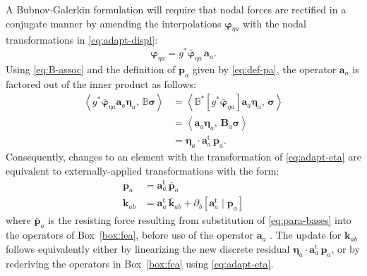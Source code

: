 A Bubnov-Galerkin formulation will require that nodal forces are rectified in a conjugate manner by amending
the interpolations \(\bm{\varphi}^{}_{\eta a}\) with
the nodal transformations in \eqref{eq:adapt-displ}: 
\begin{equation}
{\bm{\varphi}}^{}_{\eta a} = g^*\bar{\bm{\varphi}}^{}_{\eta a} \, \mathbf{a}_a .
\label{eq:adapt-eta}
\end{equation}
Using \eqref{eq:B-assoc} and the definition of \(\bm{p}_a\) given by \eqref{eq:def-pa},
the operator \(\mathbf{a}_a\) is factored out of the inner product as follows: %
\begin{equation*} 
\begin{aligned}
\left< g^* \bar{\bm{\varphi}}_{\eta a} \mathbf{a}_a \bm{\eta}_a,\, \mathbb{B} \bm{\sigma}\right> 
&= \left< \mathbb{B}^*[g^* \bar{\bm{\varphi}}_{\eta a}] \mathbf{a}_a \bm{\eta}_a,\, \bm{\sigma}\right> \\
&= \left< \mathbf{a}_a \bm{\eta}_a,\, \bm{B}_a \bm{\sigma}\right> \\
&=\bm{\eta}_a\cdot\mathbf{a}^{\mathrm{t}}_a\,\bm{p}_a .
\end{aligned}
\end{equation*}
Consequently, changes to an element with the transformation 
of \eqref{eq:adapt-eta} are equivalent to externally-applied transformations with the form:
\begin{equation} 
\begin{aligned}
\bm{p}_a    &= \mathbf{a}_a^{\mathrm{t}} \, \bar{\bm{p}}_a \\
\mathbf{k}_{ab} &= \mathbf{a}_a^{\mathrm{t}} \, \bar{\mathbf{k}}_{ab} 
  + \partial^{}_b \left[\mathbf{a}_a^{\mathrm{t}} \mid \bar{\bm{p}}_a \right]
\end{aligned}
\label{eq:adapt-para-bubn}
\end{equation}
where $\bar{\bm{p}}_{a}$ is the resisting force resulting from substitution of \eqref{eq:para-bases} into the operators of Box~\ref{box:fea},
before use of the operator \(\mathbf{a}_a\)
.%
The update
for \(\mathbf{k}_{ab}\) follows equivalently either by linearizing the new
discrete residual
\(\bm{\eta}_a\cdot \mathbf{a}_a^{\mathrm{t}} \, \bm{p}_a\), or by
rederiving
the operators in Box~\ref{box:fea} using \eqref{eq:adapt-eta}.

